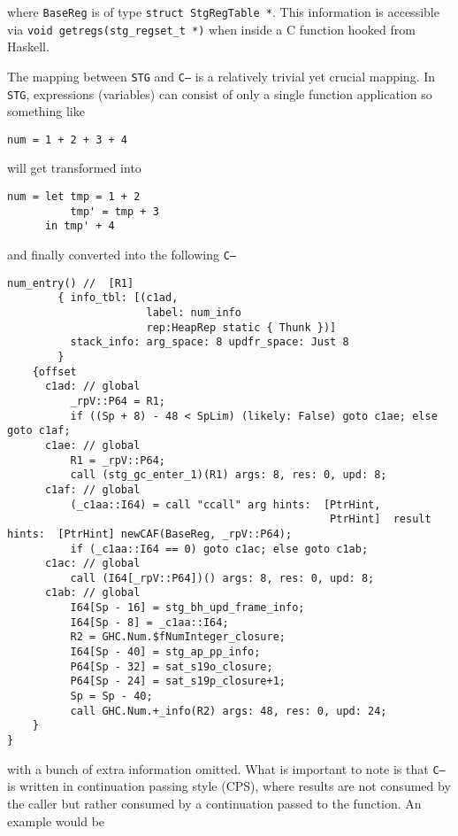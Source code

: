 \documentclass[letterpaper]{article}
\begin{document}
where \texttt{BaseReg} is of type \texttt{struct StgRegTable
*}. This information is accessible via \texttt{void getregs(stg_regset_t
*)} when inside a C function hooked from Haskell.

The mapping between \texttt{STG} and \texttt{C--} is a relatively trivial yet
crucial mapping. In \texttt{STG}, expressions (variables) can consist of only a
single function application so something like

\begin{verbatim}
num = 1 + 2 + 3 + 4
\end{verbatim}

will get transformed into

\begin{verbatim}
num = let tmp = 1 + 2
          tmp' = tmp + 3
      in tmp' + 4
\end{verbatim}

and finally converted into the following \texttt{C--}

\begin{verbatim}
num_entry() //  [R1]
        { info_tbl: [(c1ad,
                      label: num_info
                      rep:HeapRep static { Thunk })]
          stack_info: arg_space: 8 updfr_space: Just 8
        }
    {offset
      c1ad: // global
          _rpV::P64 = R1;
          if ((Sp + 8) - 48 < SpLim) (likely: False) goto c1ae; else goto c1af;
      c1ae: // global
          R1 = _rpV::P64;
          call (stg_gc_enter_1)(R1) args: 8, res: 0, upd: 8;
      c1af: // global
          (_c1aa::I64) = call "ccall" arg hints:  [PtrHint,
                                                   PtrHint]  result hints:  [PtrHint] newCAF(BaseReg, _rpV::P64);
          if (_c1aa::I64 == 0) goto c1ac; else goto c1ab;
      c1ac: // global
          call (I64[_rpV::P64])() args: 8, res: 0, upd: 8;
      c1ab: // global
          I64[Sp - 16] = stg_bh_upd_frame_info;
          I64[Sp - 8] = _c1aa::I64;
          R2 = GHC.Num.$fNumInteger_closure;
          I64[Sp - 40] = stg_ap_pp_info;
          P64[Sp - 32] = sat_s19o_closure;
          P64[Sp - 24] = sat_s19p_closure+1;
          Sp = Sp - 40;
          call GHC.Num.+_info(R2) args: 48, res: 0, upd: 24;
    }
}
\end{verbatim}

with a bunch of extra information omitted. What is important to note is that
\texttt{C--} is written in continuation passing style (CPS), where results are
not consumed by the caller but rather consumed by a continuation passed to the
function. An example would be
\end{document}
